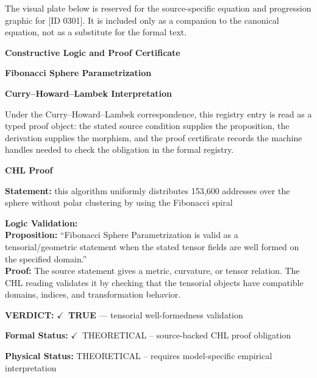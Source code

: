 \begingroup\footnotesize\sloppy
The visual plate below is reserved for the source-specific equation and progression graphic for [ID 0301]. It is included only as a companion to the canonical equation, not as a substitute for the formal text.
\par\endgroup
\ifTZPDarkEdition
{}
\fi

\clearpage
\begingroup\tzpsupportsetup
\noindent\textbf{\fontsize{10.8pt}{12.8pt}\selectfont [ID 0301] Constructive Logic and Proof Certificate}\par
\noindent\textbf{\fontsize{10pt}{12pt}\selectfont Fibonacci Sphere Parametrization}\par
\vspace{0.45em}
\begingroup
\footnotesize
\setlength{\parskip}{0.22em}
\setlength{\parindent}{0pt}
\noindent\textbf{Curry--Howard--Lambek Interpretation}\par
Under the Curry--Howard--Lambek correspondence, this registry entry is read as a typed proof
object: the stated source condition supplies the proposition, the derivation supplies the
morphism, and the proof certificate records the machine handles needed to check the obligation
in the formal registry.

\vspace{0.45em}
\noindent\textbf{CHL Proof}\par
\textbf{Statement:} this algorithm uniformly distributes 153,600 addresses over the sphere without polar
clustering by using the Fibonacci spiral

\textbf{Logic Validation:}\\
\textbf{Proposition:} ``Fibonacci Sphere Parametrization is valid as a tensorial/geometric statement when the
stated tensor fields are well formed on the specified domain.''\\
\textbf{Proof:} The source statement gives a metric, curvature, or tensor relation. The CHL reading
validates it by checking that the tensorial objects have compatible domains, indices,
and transformation behavior.

\textbf{VERDICT:} \ensuremath{\checkmark}\ \textbf{TRUE} --- tensorial well-formedness validation

\textbf{Formal Status:} \ensuremath{\checkmark}\ THEORETICAL -- source-backed CHL proof obligation

\textbf{Physical Status:} THEORETICAL -- requires model-specific empirical interpretation
\par\vspace{0.45em}
\par
\ifTZPDarkEdition
{}
\fi
\endgroup
\endgroup
